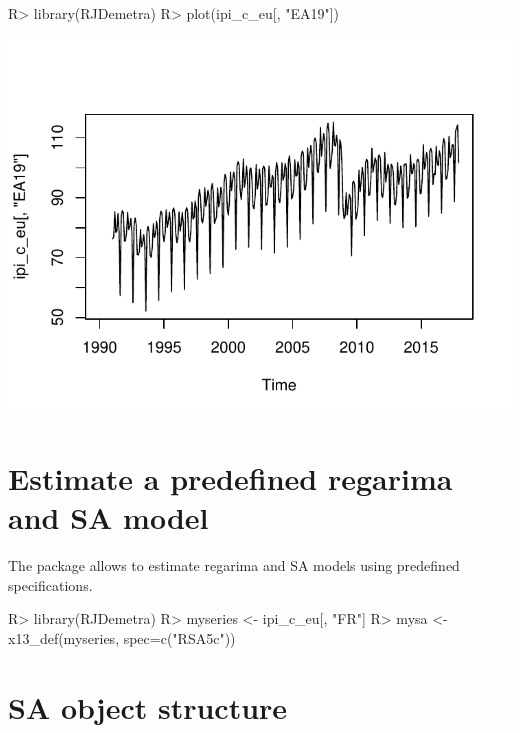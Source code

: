 \documentclass[article]{jss}
\begin{document}
\begin{CodeChunk}

\begin{CodeInput}
R> library(RJDemetra)
R> plot(ipi_c_eu[, "EA19"])
\end{CodeInput}


\begin{center}\includegraphics{documentation_files/figure-latex/unnamed-chunk-2-1} \end{center}

\end{CodeChunk}

\hypertarget{estimate-a-predefined-regarima-and-sa-model}{%
\section{Estimate a predefined regarima and SA
model}\label{estimate-a-predefined-regarima-and-sa-model}}

The package allows to estimate regarima and SA models using predefined
specifications.

\begin{CodeChunk}

\begin{CodeInput}
R> library(RJDemetra)
R> myseries <- ipi_c_eu[, "FR"]
R> mysa <- x13_def(myseries, spec=c("RSA5c"))
\end{CodeInput}
\end{CodeChunk}

\hypertarget{sa-object-structure}{%
\section{SA object structure}\label{sa-object-structure}}
\end{document}
